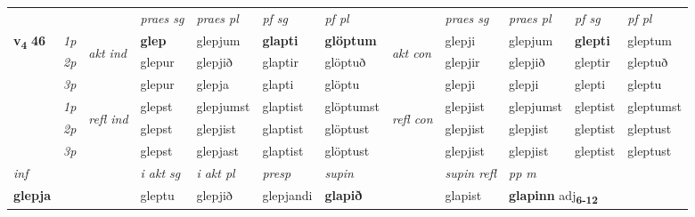 \begin{longtable}[l]{X>{\footnotesize\itshape}llXXXXlXXXX}
\midrule

 & &   & \textit{praes sg}  & \textit{praes pl}    & \textit{ pf sg} & \textit{pf pl} & & \textit{praes sg}  & \textit{praes pl}    & \textit{pf sg} & \textit{pf pl }  \\ \cmidrule{4-7} \cmidrule{9-12}
 \multirow{2}{*}{{{\textbf{v{\textsubscript{4}}} \Large{\textbf{46}}}}}  & 1p & \multirow{3}{*}{\begin{turn}{90}\textit{akt ind}\end{turn}} & \textbf{glep} & glepjum & \textbf{glapti} & \textbf{glöptum} & \multirow{3}{*}{\begin{turn}{90}\textit{akt con}\end{turn}} &glepji & glepjum & \textbf{glepti} & gleptum\\*
 & 2p &  &  glepur  & glepjið & glaptir & glöptuð & & glepjir & glepjið & gleptir & gleptuð \\*
 & 3p &  & glepur & glepja & glapti & glöptu & & glepji & glepji& glepti & gleptu \\*
\cmidrule{4-7} \cmidrule{9-12}
 & 1p & \multirow{3}{*}{\begin{turn}{90}\textit{refl ind}\end{turn}}  & glepst & glepjumst & glaptist & glöptumst & \multirow{3}{*}{\begin{turn}{90}\textit{refl con}\end{turn}}  &glepjist & glepjumst & gleptist & gleptumst \\*
 & 2p &  & glepst & glepjist & glaptist & glöptust & &glepjist & glepjist & gleptist & gleptust \\*
 & 3p  & & glepst & glepjast & glaptist & glöptust & & glepjist & glepjist& gleptist & gleptust \\*
\cmidrule{4-7} \cmidrule{9-12}

   {\textit{inf}} & &  & \textit{i akt sg} & \textit{i akt pl}   & \textit{presp} & \textit{supin} && \textit{supin refl} & \textit{pp m} \\*
  {\textbf{glepja}} & && gleptu  & glepjið   & glepjandi &  \textbf{glapið} && glapist & \multicolumn{2}{l}{\textbf{glapinn} adj\textbf{\textsubscript{6-12}}} \\*

\midrule


\end{longtable}
